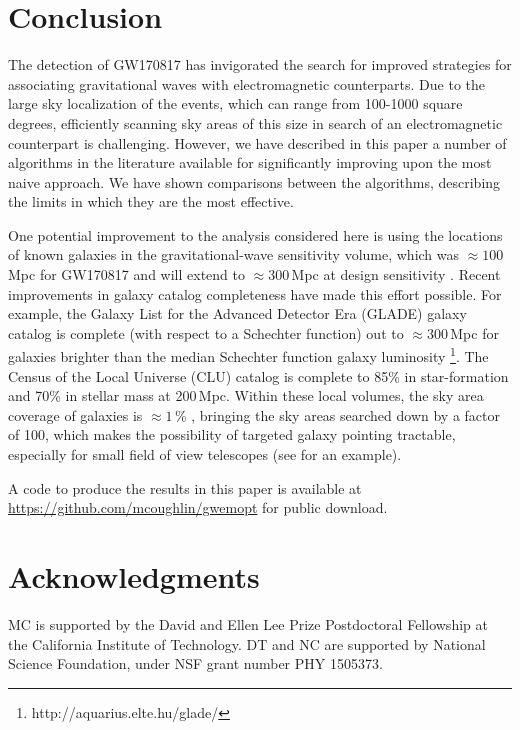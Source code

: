 \documentclass[twocolumn]{aastex61}
\begin{document}
\section{Conclusion}
\label{sec:conclusions}

The detection of GW170817 \citep{AbEA2017b} has invigorated the search for improved strategies for associating gravitational waves with electromagnetic
counterparts.
Due to the large sky localization of the events, which can range from 100-1000 square degrees, efficiently scanning sky areas  of this size in search of an electromagnetic counterpart is challenging.
However, we have described in this paper a number of algorithms in the literature available for significantly improving upon the most naive approach.
We have shown comparisons between the algorithms, describing the limits in which they are the most effective.

One potential improvement to the analysis considered here is using the locations of known galaxies in the gravitational-wave sensitivity volume, which was $\approx 100$\,Mpc for GW170817 \citep{AbEA2017b} and will extend to $\approx 300$\,Mpc at design sensitivity \citep{aLIGO}. 
Recent improvements in galaxy catalog completeness have made this effort possible. For example, the Galaxy List for the Advanced Detector Era (GLADE) galaxy catalog is complete (with respect to a Schechter function) out to $\approx 300$\,Mpc for galaxies brighter than the median Schechter function galaxy luminosity \footnote{http://aquarius.elte.hu/glade/}. The Census of the Local Universe (CLU) catalog \citep{CoKa2017} is complete to 85\% in star-formation and 70\% in stellar mass at 200\,Mpc.
Within these local volumes, the sky area coverage of galaxies is $\approx 1$\,\% \cite{CoKa2017}, bringing the sky areas searched down by a factor of 100, which makes the possibility of targeted galaxy pointing tractable, especially for small field of view telescopes (see \cite{ArMc2017} for an example). 

A code to produce the results in this paper is available at 
\url{https://github.com/mcoughlin/gwemopt} for public download.

\section{Acknowledgments}
MC is supported by the David and Ellen Lee Prize Postdoctoral Fellowship at the California Institute of Technology. 
DT and NC are supported by National Science Foundation, under NSF grant number PHY 1505373.



\end{document}
